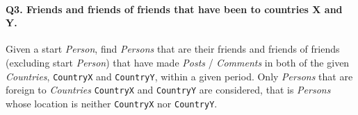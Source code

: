 \paragraph{\textbf{Q3}. Friends and friends of friends that have been to countries X and Y.}
Given a start \emph{Person}, find \emph{Persons} that are their friends
and friends of friends (excluding start \emph{Person}) that have made
\emph{Posts} / \emph{Comments} in both of the given \emph{Countries},
\texttt{CountryX} and \texttt{CountryY}, within a given period. Only
\emph{Persons} that are foreign to \emph{Countries} \texttt{CountryX}
and \texttt{CountryY} are considered, that is \emph{Persons} whose
location is neither \texttt{CountryX} nor \texttt{CountryY}.
